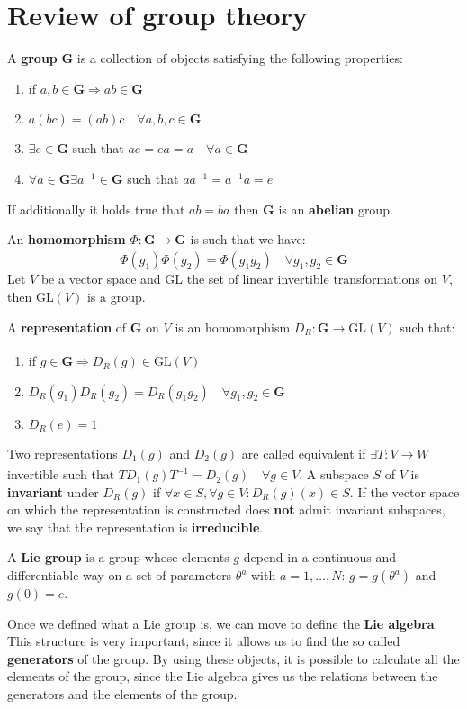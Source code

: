 \documentclass[../main.tex]{subfiles}
\begin{document}
\section{Review of group theory}
\begin{definition}
A \textbf{group} \textbf{G} is a collection of objects satisfying the following properties:
\begin{enumerate}
    \item if $a,b\in\textbf{G}\Rightarrow ab\in\textbf{G}$
    \item $a(bc)=(ab)c \quad \forall a,b,c\in\textbf{G}$
    \item $\exists e\in\textbf{G}$ such that $ae=ea=a \quad \forall a\in\textbf{G}$
    \item $\forall a\in\textbf{G}\exists a^{-1}\in\textbf{G}$ such that $aa^{-1}=a^{-1}a=e$
\end{enumerate}
If additionally it holds true that $ab=ba$ then \textbf{G} is an \textbf{abelian} group.
\end{definition}
An \textbf{homomorphism} $\Phi:\textbf{G}\xrightarrow[]{}\textbf{G}$ is such that we have:
\[
\Phi(g_1)\Phi(g_2)=\Phi(g_1g_2) \quad \forall g_1,g_2\in\textbf{G}
\]
Let $V$ be a vector space and GL the set of linear invertible transformations on $V$, then GL$(V)$ is a group.
\begin{definition}
A \textbf{representation} of \textbf{G} on $V$ is an homomorphism $D_R:\textbf{G}\xrightarrow[]{}$GL$(V)$ such that:
\begin{enumerate}
    \item if $g\in\textbf{G}\Rightarrow D_R(g)\in$GL$(V)$
    \item $D_R(g_1)D_R(g_2)=D_R(g_1g_2) \quad \forall g_1,g_2\in\textbf{G}$
    \item $D_R(e)=1$
\end{enumerate}
\end{definition}
Two representations $D_1(g)$ and $D_2(g)$ are called equivalent if $\exists T:V\xrightarrow[]{}W$ invertible such that $TD_1(g)T^{-1}=D_2(g) \quad \forall g\in V$. A subspace $S$ of $V$ is \textbf{invariant} under $D_R(g)$ if $\forall x\in S, \forall g\in V: D_R(g)(x)\in S$. If the vector space on which the representation is constructed does \textbf{not} admit invariant subspaces, we say that the representation is \textbf{irreducible}.
\begin{definition}
A \textbf{Lie group} is a group whose elements $g$ depend in a continuous and differentiable way on a set of parameters $\theta^a$ with $a=1,\dots,N$: $g=g(\theta^a)$ and $g(0)=e$.
\end{definition}
Once we defined what a Lie group is, we can move to define the \textbf{Lie algebra}. This structure is very important, since it allows us to find the so called \textbf{generators} of the group. By using these objects, it is possible to calculate all the elements of the group, since the Lie algebra gives us the relations between the generators and the elements of the group.
\end{document}
